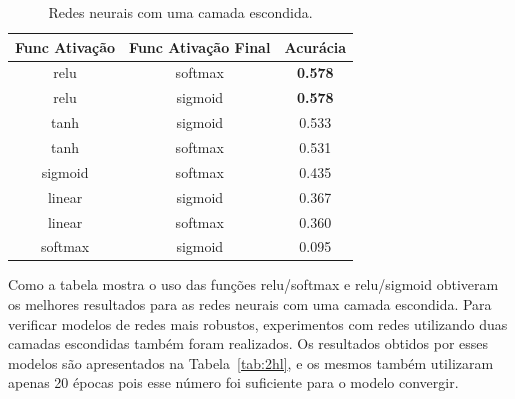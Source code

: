 \documentclass[conference]{IEEEtran}
\begin{document}
\begin{table}[h!]
	\centering
	
	\begin{tabular}{ccc} \toprule
		\textbf{Func Ativação} & \textbf{Func Ativação Final} & \textbf{Acurácia} \\ \toprule 
		relu                   & softmax                      & \textbf{0.578}             \\
		relu                   & sigmoid                      & \textbf{0.578}             \\
		tanh                   & sigmoid                      & 0.533             \\
		tanh                   & softmax                      & 0.531             \\	
		sigmoid                & softmax                      & 0.435             \\
		linear                 & sigmoid                      & 0.367             \\
		linear                 & softmax                      & 0.360             \\
		
		softmax                & sigmoid                      & 0.095      \\ \bottomrule      
	\end{tabular}
	\caption{Redes neurais com uma camada escondida.}
	\label{tab:1hl}
\end{table}

Como a tabela mostra o uso das funções relu/softmax e relu/sigmoid obtiveram os melhores resultados para as redes neurais com uma camada escondida. Para verificar modelos de redes mais robustos, experimentos com redes utilizando duas camadas escondidas também foram realizados. Os resultados obtidos por esses modelos são apresentados na Tabela~\ref{tab:2hl}, e os mesmos também utilizaram apenas 20 épocas pois esse número foi suficiente para o modelo convergir.
\end{document}
